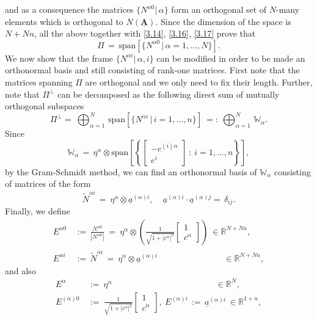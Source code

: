 \documentclass{amsart}
\theoremstyle{definition}
\numberwithin{equation}{section}
\begin{document}
and as a consequence the matrices $\{N^{{\alpha}0}|\, {\alpha}\}$ form an orthogonal set of $N$-many elements which is orthogonal to $N({\underline{\textbf{A}}})$. Since the dimension of the space is $N+Nn$, all the above together with \eqref{3.14}, \eqref{3.16}, \eqref{3.17} prove that
\begin{equation}   \label{3.19}
\Pi \, =\,  {\textrm{span}}[\Big\{ N^{{\alpha} 0}\, \big|\, {\alpha}=1,...,N \Big\}].
\end{equation}
We now show that the frame $\{N^{{\alpha} i}|\, {\alpha},i\}$ can be modified in order to be made an orthonormal basis and still consisting of rank-one matrices. First note that the matrices spanning $\Pi$ are orthogonal and we only need to fix their length. Further, note that $\Pi^\bot$ can be decomposed as the following direct sum of mutually orthogonal subspaces
\[
\Pi^\bot=\ \bigoplus_{{\alpha}=1}^N \,{\textrm{span}}[\Big\{ N^{{\alpha} i}\, \big| \, i=1,...,n \Big\} ]\ =:\  \bigoplus_{{\alpha}=1}^N \,\mathbb{W}_{\alpha} .
\]
Since
\[
\mathbb{W}_{\alpha} \, =\, \eta^{\alpha} {\otimes} {\textrm{span}}[\left\{  \left[
\begin{array}{c}
-c^{(i){\alpha}}\\
\hline e^i
\end{array}
\right]  \, : \ i=1,...,n \right\} ] ,
\]
by the Gram-Schmidt method, we can find an orthonormal basis of $\mathbb{W}_{\alpha}$ consisting of matrices of the form
\begin{equation}
\tilde{N}^{{\alpha} i}\, =\ \eta^{\alpha} {\otimes} \underline{a}^{({\alpha})i},\ \ \ \ \ \underline{a}^{({\alpha})i}\cdot \underline{a}^{({\alpha})j}=\, {\delta}_{ij}. 
\end{equation}
Finally, we define
\[
\begin{split}
E^{{\alpha} 0}\, &:=\, \frac{N^{{\alpha} 0}}{|N^{{\alpha} 0}|}\ =\ \eta^{\alpha} {\otimes} \left( \frac{1}{\sqrt{1+|c^{\alpha}|^2}}     \left[
\begin{array}{c}
1\\
\hline c^{\alpha}
\end{array}
\right] \right) \ \in {\mathbb{R}}^{N+Nn},\\
E^{{\alpha} i}\, &:=\, \tilde{N}^{{\alpha} i}\, =\ \eta^{\alpha} {\otimes} \underline{a}^{({\alpha})i} \hspace{93pt} \in {\mathbb{R}}^{N+Nn},
\end{split}
\]
and also
\[
\begin{split}
E^{\alpha}\, &:=\  \eta^{\alpha}  \hspace{145pt} \in {\mathbb{R}}^N, \\
 E^{({\alpha})0}\, &:=\  \frac{1}{\sqrt{1+|c^{\alpha}|^2}}  \left[
\begin{array}{c}
1\\
\hline c^{\alpha}
\end{array}
\right],\ E^{({\alpha})i}\, :=\, \underline{a}^{({\alpha})i} \ \in {\mathbb{R}}^{1+n},
\end{split}
\]
\end{document}
